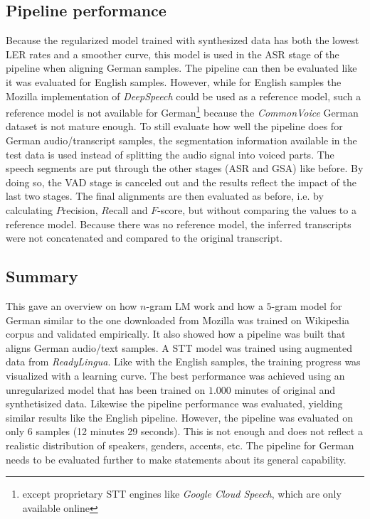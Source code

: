 \subsection{Pipeline performance}

Because the regularized model trained with synthesized data has both the lowest \ac{LER} rates and a smoother curve, this model is used in the \ac{ASR} stage of the pipeline when aligning German samples. The pipeline can then be evaluated like it was evaluated for English samples. However, while for English samples the Mozilla implementation of \textit{DeepSpeech} could be used as a reference model, such a reference model is not available for German\footnote{except proprietary \ac{STT} engines like \textit{Google Cloud Speech}, which are only available online} because the \textit{CommonVoice} German dataset is not mature enough. To still evaluate how well the pipeline does for German audio/transcript samples, the segmentation information available in the test data is used instead of splitting the audio signal into voiced parts. The speech segments are put through the other stages (\ac{ASR} and \ac{GSA}) like before. By doing so, the \ac{VAD} stage is canceled out and the results reflect the impact of the last two stages. The final alignments are then evaluated as before, i.e. by calculating $P$recision, $R$ecall and $F$-score, but without comparing the values to a reference model. Because there was no reference model, the inferred transcripts were not concatenated and compared to the original transcript.

\subsection{Summary}

This gave an overview on how $n$-gram \ac{LM} work and how a $5$-gram model for German similar to the one downloaded from Mozilla was trained on Wikipedia corpus and validated empirically. It also showed how a pipeline was built that aligns German audio/text samples. A \ac{STT} model was trained using augmented data from \textit{ReadyLingua}. Like with the English samples, the training progress was visualized with a learning curve. The best performance was achieved using an unregularized model that has been trained on $1.000$ minutes of original and synthetisized data. Likewise the pipeline performance was evaluated, yielding similar results like the English pipeline. However, the pipeline was evaluated on only 6 samples (12 minutes 29 seconds). This is not enough and does not reflect a realistic distribution of speakers, genders, accents, etc. The pipeline for German needs to be evaluated further to make statements about its general capability.